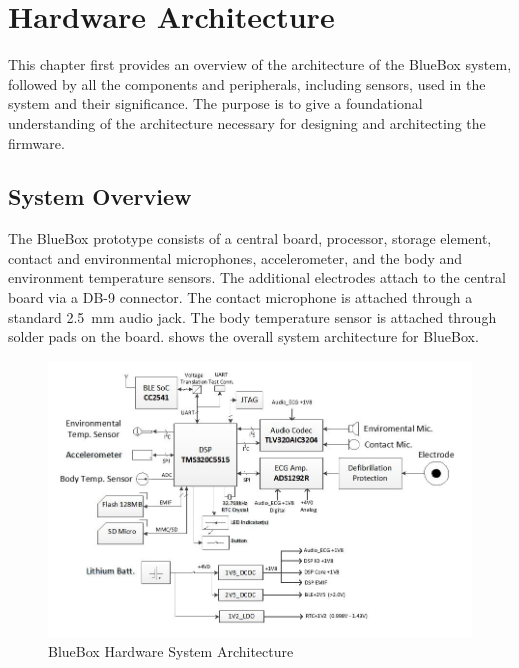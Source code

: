 \chapter{Hardware Architecture}

This chapter first provides an overview of the architecture of the
BlueBox system, followed by all the components and peripherals,
including sensors, used in the system and their significance.  The
purpose is to give a foundational understanding of the architecture
necessary for designing and architecting the firmware.

\section{System Overview}

The BlueBox prototype consists of a central board, processor, storage
element, contact and environmental microphones, accelerometer, and
the body and environment temperature sensors. The additional
electrodes attach to the central board via a DB-9 connector. The
contact microphone is attached through a standard 2.5~mm audio jack.
The body temperature sensor is attached through solder pads on the
board.   shows the overall system
architecture for BlueBox.

\begin{figure}
	\centering
	\includegraphics[scale = 0.75 ]{BlueBox_Architecture}
	\caption{BlueBox Hardware System Architecture\label{BlueBox_Architecture}}
	\label{fig:bbSysArch}
\end{figure} 


